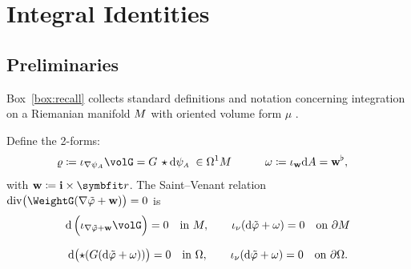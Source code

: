\chapter{Integral Identities}\label{sec:integration}


\section{Preliminaries}

Box~\ref{box:recall} collects standard definitions and notation concerning integration on a Riemanian manifold \(M\) with oriented volume form \(\mu\) \citep{marsden1994mathematical,abraham1988manifolds,shilov1996elementary,spivak1965calculus}.


Define the 2-forms:
\[
\begin{aligned}
    \varrho &\coloneq \interior{\nabla\WarpFA}{\volG}
            = G\,\starE \dd\WarpFA \;\in\Omega^{1}\PlaneManifold
    &\qquad
    \omega &\coloneq \ii_{\qvec}\dd A
            = \qvec^{\flat},
\end{aligned}
\]
with \(\qvec \coloneq \FrameBasis\times\bm{r}\). 
The Saint–Venant relation
\(
   \operatorname{div}\bigl(\WeightG(\nabla\WarpSV+\qvec)\bigr)=0
\)
is
\begin{equation}
   \dd \,\Bigl(\ii_{\nabla\WarpSV+\qvec}\volG\Bigr)=0
   \quad\text{in }\PlaneManifold,
   \qquad
   \ii_{\nu}(\dd\WarpSV+\omega)=0
   \quad\text{on }\PlaneBoundary
   \label{eq:warp-sv-bvp}
\end{equation}

\[
   \mathrm{d}\bigl(\star(G(\mathrm{d}\tilde{\varphi}+\omega))\bigr)=0
   \quad\text{in }\Omega,
   \qquad
   \iota_{\nu}(\mathrm{d}\tilde{\varphi}+\omega)=0
   \quad\text{on }\partial\Omega.
\]

